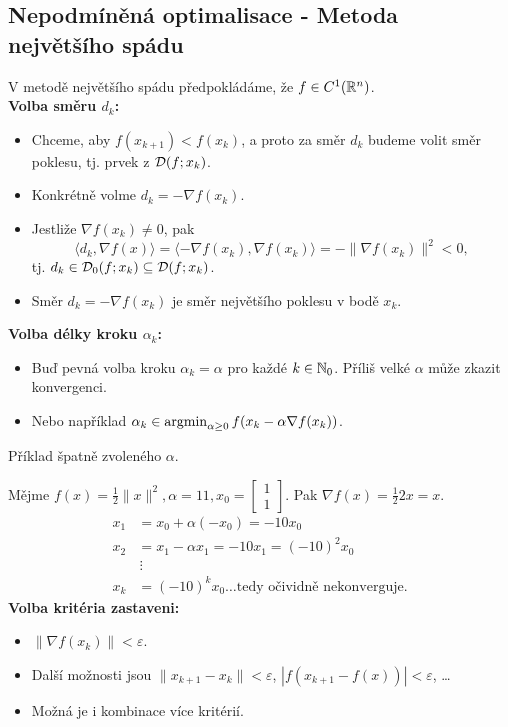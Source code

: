 \subsection{Nepodmíněná optimalisace - Metoda největšího spádu}
V metodě největšího spádu předpokládáme, že $f \in C^1(\mathbb{R}^n)$.\\
\textbf{Volba směru $d_k$:}
\begin{itemize}
    \item Chceme, aby $f(x_{k+1}) < f(x_k)$, a proto za směr $d_k$ budeme volit směr poklesu, tj. prvek z $\mathcal{D}(f; x_k)$.
    \item Konkrétně volme $d_k = -\nabla f(x_k)$.
    \item Jestliže $\nabla f(x_k) \not= 0$, pak 
    \[
        \langle d_k, \nabla f(x)\rangle = \langle -\nabla f(x_k), \nabla f(x_k)\rangle = - \| \nabla f(x_k)\|^2 < 0,
    \] tj. $d_k \in \mathcal{D}_0(f; x_k) \subseteq \mathcal{D}(f;x_k)$.
    \item Směr $d_k = -\nabla f (x_k)$ je směr největšího poklesu v bodě $x_k$.
\end{itemize}
\textbf{Volba délky kroku $\alpha_k$:}
\begin{itemize}
    \item Buď pevná volba kroku $\alpha_k = \alpha$ pro každé $k \in \mathbb{N}_0$. Příliš velké $\alpha$ může zkazit konvergenci.
    \item Nebo například $\alpha_k \in \operatorname*{argmin}_{\alpha \geq 0} f(x_k - \alpha \nabla f(x_k))$.
\end{itemize}
Příklad špatně zvoleného $\alpha$.

Mějme $f(x) = \frac{1}{2} \| x\|^2, \alpha = 11, x_0 = \begin{bmatrix}1 \\ 1\end{bmatrix}$. 
Pak $\nabla f(x) = \frac{1}{2}2 x = x$.
\begin{align*}
    x_1 &= x_0 + \alpha (-x_0) = -10 x_0 \\
    x_2 &= x_1 - \alpha x_1 = -10x_1 = (-10)^2 x_0 \\
    &\, \vdots \\
    x_k &= (-10)^k x_0 \dots \text{tedy očividně nekonverguje.}
\end{align*}
\textbf{Volba kritéria zastaveni:}
\begin{itemize}
    \item $\|\nabla f(x_k)\| < \varepsilon$.
    \item Další možnosti jsou $\| x_{k+1} - x_k\| < \varepsilon$, $|f(x_{k+1} - f(x))| < \varepsilon$, \dots
    \item Možná je i kombinace více kritérií.
\end{itemize}


